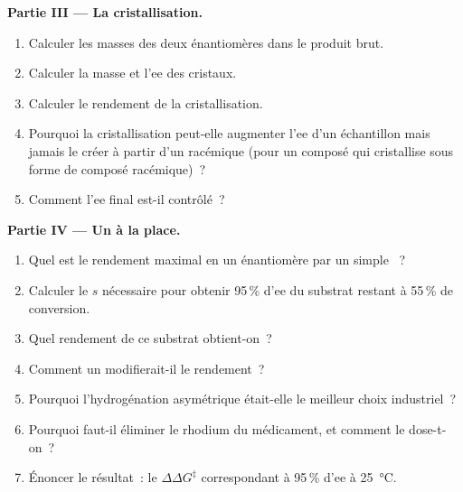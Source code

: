\begin{problem}
\medskip\noindent\textbf{Partie III --- La cristallisation.}
\begin{enumerate}[resume]
  \item Calculer les masses des deux énantiomères dans le produit brut.
  \item Calculer la masse et l'ee des cristaux.
  \item Calculer le rendement de la cristallisation.
  \item Pourquoi la cristallisation peut-elle augmenter l'ee d'un
        échantillon mais jamais le créer à partir d'un racémique (pour un
        composé qui cristallise sous forme de composé racémique)~?
  \item Comment l'ee final est-il contrôlé~?
\end{enumerate}

\medskip\noindent\textbf{Partie IV --- Un  à la place.}
\begin{enumerate}[resume]
  \item Quel est le rendement maximal en un énantiomère par un simple
        ~?
  \item Calculer le $s$ nécessaire pour obtenir 95\,\% d'ee du substrat restant à 55\,\% de conversion.
  \item Quel rendement de ce substrat obtient-on~?
  \item Comment un  modifierait-il le
        rendement~?
  \item Pourquoi l'hydrogénation asymétrique était-elle le meilleur choix
        industriel~?
  \item Pourquoi faut-il éliminer le rhodium du médicament, et comment le
        dose-t-on~?
  \item Énoncer le résultat~: le $\Delta\Delta G^\ddagger$ correspondant à 95\,\% d'ee à \qty{25}{\celsius}.
\end{enumerate}
\end{problem}
